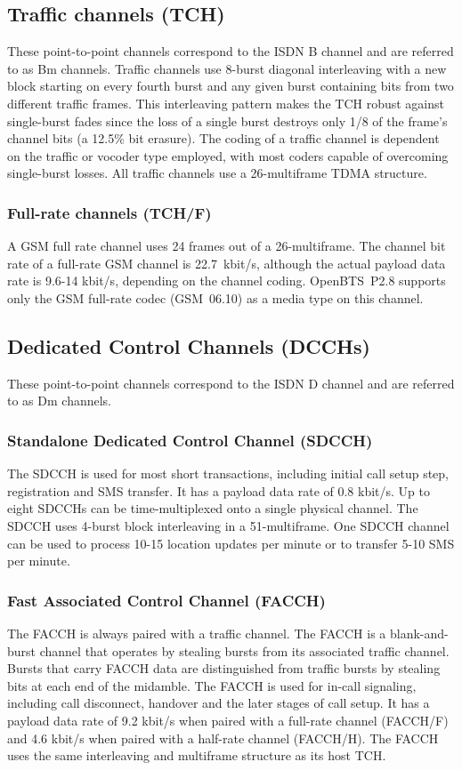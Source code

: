 \documentclass[11pt,openany]{book}
\begin{document}
\subsection{Traffic channels (TCH)}
These point-to-point channels correspond to the ISDN B channel and are referred to as Bm channels. Traffic channels use 8-burst diagonal interleaving with a new block starting on every fourth burst and any given burst containing bits from two different traffic frames. This interleaving pattern makes the TCH robust against single-burst fades since the loss of a single burst destroys only 1/8 of the frame's channel bits (a 12.5\% bit erasure). The coding of a traffic channel is dependent on the traffic or vocoder type employed, with most coders capable of overcoming single-burst losses. All traffic channels use a 26-multiframe TDMA structure.

\subsubsection{Full-rate channels (TCH/F)}
A GSM full rate channel uses 24 frames out of a 26-multiframe. The channel bit rate of a full-rate GSM channel is 22.7~kbit/s, although the actual payload data rate is 9.6-14 kbit/s, depending on the channel coding. OpenBTS~P2.8 supports only the GSM full-rate codec (GSM~06.10) as a media type on this channel.

\subsection{Dedicated Control Channels (DCCHs)}
These point-to-point channels correspond to the ISDN D channel and are referred to as Dm channels.

\subsubsection{Standalone Dedicated Control Channel (SDCCH)}
The SDCCH is used for most short transactions, including initial call setup step, registration and SMS transfer. It has a payload data rate of 0.8 kbit/s. Up to eight SDCCHs can be time-multiplexed onto a single physical channel. The SDCCH uses 4-burst block interleaving in a 51-multiframe.  One SDCCH channel can be used to process 10-15 location updates per minute or to transfer 5-10 SMS per minute.

\subsubsection{Fast Associated Control Channel (FACCH)}
The FACCH is always paired with a traffic channel. The FACCH is a blank-and-burst channel that operates by stealing bursts from its associated traffic channel. Bursts that carry FACCH data are distinguished from traffic bursts by stealing bits at each end of the midamble. The FACCH is used for in-call signaling, including call disconnect, handover and the later stages of call setup. It has a payload data rate of 9.2 kbit/s when paired with a full-rate channel (FACCH/F) and 4.6 kbit/s when paired with a half-rate channel (FACCH/H). The FACCH uses the same interleaving and multiframe structure as its host TCH.
\end{document}
